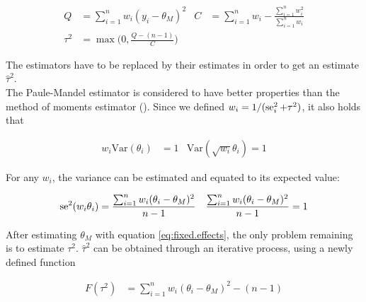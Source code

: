 \documentclass[11pt,a4paper,twoside]{book}\usepackage[]{graphicx}\usepackage[]{color}
\begin{document}
\begin{align}
Q &= \sum_{i = 1}^n w_i(y_i - \theta_M)^2 & C &= \sum_{i = 1}^n w_i - \frac{\sum_{i = 1}^n w_i^2}{\sum_{i = 1}^n w_i} \label{eq:Q.heterogeneity} \\
\tau^2 &= \max\big(0, \frac{Q - (n-1)}{C}\big) \label{eq:Tau.definition}
\end{align}

The estimators have to be replaced by their estimates in order to get an estimate $\hat{\tau}^2$.\\
The Paule-Mandel estimator \citep{paulemandel} is considered to have better properties than the method of moments estimator (\eg \citet{tau.estimator.evaluation}). Since we defined $w_i = 1/(\operatorname{se}_i^2 + \tau^2)$, it also holds that

\begin{align}
w_i \textrm{Var}(\theta_i) &= 1 & \textrm{Var}(\sqrt{w_i}\theta_i) = 1 \nonumber
\end{align}

For any $w_i$, the variance can be estimated and equated to its expected value:

\begin{align}
\operatorname{se}^2(w_i\theta_i) &= \frac{\sum_{i = 1}^n w_i(\theta_i - \theta_M)^2}{n-1} & \frac{\sum_{i = 1}^n w_i(\theta_i - \theta_M)^2}{n-1} = 1 \label{eq:paulemandel}
\end{align}

After estimating $\theta_M$ with equation \eqref{eq:fixed.effects}, the only problem remaining is to estimate $\tau^2$. $\hat{\tau}^2$ can be obtained through an iterative process, using a newly defined function

\begin{align}
F(\tau^2) &= \sum_{i = 1}^n w_i(\theta_i - \theta_M)^2 - (n-1) \nonumber
\end{align}
\end{document}
